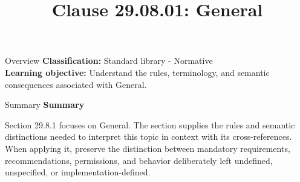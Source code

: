 \documentclass[10pt,letterpaper]{article}
\title{Clause 29.08.01: General}
\author{}
\date{}
\begin{document}
\maketitle
\begin{CornellOverviewBox}{Overview}
\textbf{Classification:} Standard library - Normative\\[2pt]
\textbf{Learning objective:} Understand the rules, terminology, and semantic consequences associated with General.
\end{CornellOverviewBox}\begin{CornellSummaryBox}{Summary}
{\sffamily\bfseries\color{Accent} Summary}\par\vspace{3pt}Section 29.8.1 focuses on General. The section supplies the rules and semantic distinctions needed to interpret this topic in context with its cross-references. When applying it, preserve the distinction between mandatory requirements, recommendations, permissions, and behavior deliberately left undefined, unspecified, or implementation-defined.
\end{CornellSummaryBox}
\end{document}
